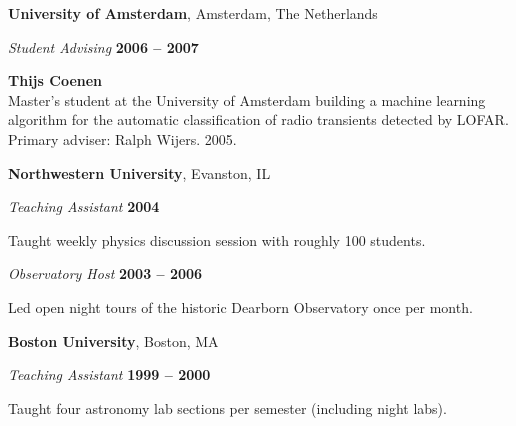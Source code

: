\documentclass[11pt]{article}
\newcommand{\halfblankline}{\quad\vspace{-0.5\baselineskip}\pagebreak[3]}
\begin{document}
\halfblankline

\textbf{University of Amsterdam}, Amsterdam, The Netherlands
\begin{outerlist}

\item[] \textit{Student Advising}
    \hfill \textbf{2006 -- 2007}
    \begin{innerlist}
       \item \textbf{Thijs Coenen}\\
        Master's student at the University of Amsterdam building 
        a machine learning algorithm for the automatic classification 
        of radio transients detected by LOFAR.
        Primary adviser: Ralph Wijers.
        2005.
     \end{innerlist}
\end{outerlist}

\halfblankline

\textbf{Northwestern University}, Evanston, IL
\begin{outerlist}

\item[] \textit{Teaching Assistant} 
    \hfill \textbf{2004}
    \begin{innerlist}
        \item Taught weekly physics discussion session with roughly 100 students.
    \end{innerlist}

\item[] \textit{Observatory Host} 
    \hfill \textbf{2003 -- 2006}
    \begin{innerlist}
        \item Led open night tours of the historic Dearborn Observatory once per month.
    \end{innerlist}
    
\end{outerlist}

\halfblankline

\textbf{Boston University}, Boston, MA
\begin{outerlist}

\item[] \textit{Teaching Assistant} 
    \hfill \textbf{1999 -- 2000}
    \begin{innerlist}
        \item Taught four astronomy lab sections per semester (including night labs).
    \end{innerlist}
\end{outerlist}
\end{document}
